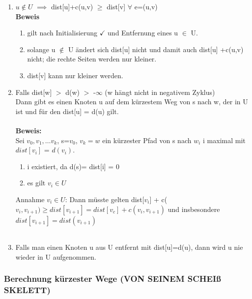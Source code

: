 \documentclass{article}
\begin{document}
\begin{enumerate}[label=\textbf{\arabic*. Eigenschaft:}]
\item $u \notin U$ $\implies$ dist[u]+c(u,v) $\geq$ dist[v] $\forall$ e=(u,v)\\

\textbf{Beweis}

\begin{enumerate}[label=\textbf{(\arabic*)}]
  \item gilt nach Initialisierung $\checkmark$ und Entfernung eines u $\in$ U.
  \item solange u $\notin$ U ändert sich dist[u] nicht und damit auch dist[u] +c(u,v) nicht; die rechte Seiten werden nur kleiner.
  \item dist[v] kann nur kleiner werden.
\end{enumerate}

\item Falls dist[w] $>$ d(w) $>$ -$\infty$ (w hängt nicht in negativem Zyklus)\\

Dann gibt es einen Knoten u auf dem kürzestem Weg von s nach w, der in U ist und für den dist[u] = d(u) gilt.\\
\\
\textbf{Beweis:} \\
Sei $v_0, v_1, \dots v_k$, s=$v_0$, $v_k=w$ ein kürzester Pfad von s nach $w_i$ i maximal mit $dist[v_i]$ = $d(v_i)$.\\
\begin{enumerate}
  \item i existiert, da d(s)= dist[i] = 0
  \item es gilt $v_i \in U$
\end{enumerate}

Annahme $v_i \in U$: Dann müsste gelten dist[$v_i$] + c($v_i,v_{i+1}) \geq dist[v_{i+1}] = dist[v_c]+c(v_i,v_{i+1})$
und insbesondere $dist[v_{i+1}] = dist(v_{i+1})$\\
\\

\item Falls man einen Knoten u aus U entfernt mit dist[u]=d(u), dann wird u nie wieder in U aufgenommen.\\

\end{enumerate}



\subsubsection{Berechnung kürzester Wege (VON SEINEM SCHEIß SKELETT)}
\end{document}
